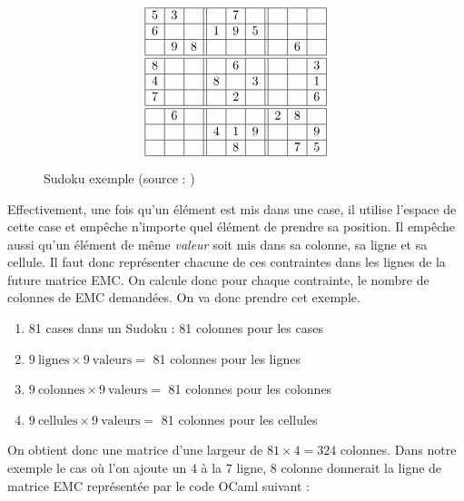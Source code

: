 \documentclass[a4paper]{article}
\begin{document}
\begin{figure}[h]
\centering
\[
\begin{array}{|c|c|c||c|c|c||c|c|c|}
\hline
5 & 3 &   &   & 7 &   &  &   &    \\
\hline
6 &   &   & 1 & 9 & 5 &  &   &    \\
\hline
  & 9 & 8 &   &   &   &  & 6 &    \\
\hline
\hline
8 &   &   &   & 6 &   &   &   & 3 \\
\hline
4 &   &   & 8 &   & 3 &   &   & 1 \\
\hline
7 &   &   &   & 2 &   &   &   & 6 \\
\hline
\hline
  & 6 &   &   &   &   & 2 & 8 &   \\
\hline
  &   &   & 4 & 1 & 9 &   &   & 9 \\
\hline
  &   &   &   & 8 &   &   & 7 & 5 \\
\hline
\end{array}
\]
\caption{\label{sudoku} Sudoku exemple (source : \cite{sudoku})}
\end{figure}


Effectivement, une fois qu'un élément est mis dans une case, il utilise l'espace
de cette case et empêche n'importe quel élément de prendre sa position. 
Il empêche aussi qu'un élément de même \emph{valeur} soit mis dans 
sa colonne, sa ligne et sa cellule. 
Il faut donc représenter chacune de ces contraintes dans les lignes de 
la future matrice EMC. On calcule donc pour chaque contrainte, le nombre de
colonnes de EMC demandées. On va donc prendre cet exemple.


\begin{enumerate}
\item 81 cases dans un Sudoku
: 81 colonnes pour les cases
\item $ 9~\textrm{lignes} \times 9~\textrm{valeurs} = $ 
81 colonnes pour les lignes
\item $ 9~\textrm{colonnes} \times 9~\textrm{valeurs} = $ 
81 colonnes pour les colonnes
\item $ 9~\textrm{cellules} \times 9~\textrm{valeurs} = $
81 colonnes pour les cellules
\end{enumerate}

On obtient donc une matrice d'une largeur de $ 81 \times 4 = 324 $ colonnes. 
Dans notre exemple le cas où l'on ajoute un 4 à la 7 ligne, 8 
colonne donnerait la ligne de matrice EMC représentée par le code OCaml 
suivant : 


\end{document}
